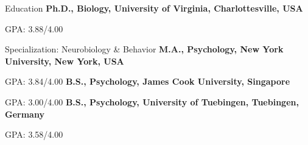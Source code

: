 \begin{rubric}{Education}
%
    \textbf{Ph.D., Biology, University of Virginia, Charlottesville, USA }\par
    GPA: 3.88/4.00 \par
    Specialization: Neurobiology \& Behavior
%
%
    \textbf{M.A., Psychology, New York University, New York, USA }\par
    GPA: 3.84/4.00
%
%
    \textbf{B.S., Psychology, James Cook University, Singapore }\par
    GPA: 3.00/4.00
%
%
    \textbf{B.S., Psychology, University of Tuebingen, Tuebingen, Germany }\par
    GPA: 3.58/4.00
\end{rubric}
